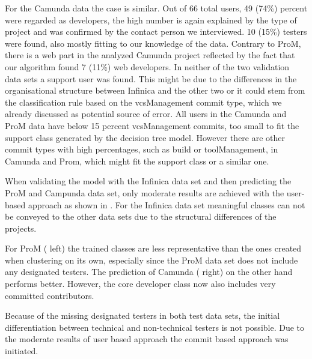 For the Camunda data the case is similar. Out of 66 total users, 49 (74\%)
percent were regarded as developers, the high number is again explained by the
type of project and was confirmed by the contact person we interviewed. 10 (15\%)
testers were found, also mostly fitting to our knowledge of the data. Contrary
to ProM, there is a web part in the analyzed Camunda project reflected by the
fact that our algorithm found 7 (11\%) web developers. In neither of the two validation data sets a support user was found. This might be due to the differences in the organisational structure between Infinica and the other two or it could stem from the classification rule based on the vcsManagement commit type, which we already discussed as potential source of error. All users in the Camunda and ProM data have below 15 percent vcsManagement commits, too small to fit the support class generated by the decision tree model. However there are other commit types with high percentages, such as build or toolManagement, in Camunda and Prom, which might fit the support class or a similar one.

When validating the model with the Infinica data set and then predicting the ProM and Campunda data set, only moderate results are achieved with the user-based approach as shown in . For the Infinica data set meaningful classes can not be conveyed to the other data sets due to the structural differences of the projects.


For ProM ( left) the trained classes are less representative than the ones created when clustering on its own, especially since the ProM data set does not include any designated testers. The prediction of Camunda ( right) on the other hand performs better. However, the core developer class now also includes very committed contributors.

Because of the missing designated testers in both test data sets, the initial differentiation between technical and non-technical testers is not possible. Due to the moderate results of user based approach the commit based approach was initiated.


